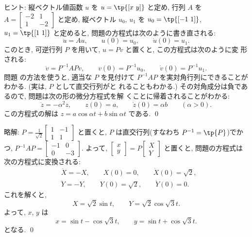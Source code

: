 \documentclass[12pt,twoside]{jarticle}
\newcommand\commentout[1]{#1}
\newcommand\commentout[1]{}
\begin{document}
\noindent
ヒント: 縦ベクトル値函数 $u$ を %
$u=\tp{[x\ y]}$ と定め, 行列 $A$ を %
$A=\begin{bmatrix}-2&1\\1&-2\end{bmatrix}$ と定め, 縦ベクトル $u_0$, $u_1$ 
を $u_0=\tp{[-1\ 1]}$, $u_1=\tp{[1\ 1]}$ と定めると, 
問題の方程式は次のように書き直される:
\begin{equation*}
  \ddot u = Au, \qquad u(0)=u_0, \qquad \dot u(0)=u_1.
\end{equation*}
このとき, 可逆行列 $P$ を用いて, $u=Pv$ と置くと, この方程式は次のように変
形される:
\begin{equation*}
  \ddot v = P^{-1}APv, \qquad v(0)=P^{-1}u_0, \qquad \dot v(0)=P^{-1}u_1.
\end{equation*}
問題  の方法を使うと, 適当な $P$ を見付けて %
$P^{-1}AP$ を実対角行列にできることがわかる. (実は, $P$ として直交行列がと
れることもわかる.) その対角成分は負であるので, 問題は次の形の微分方程式を解
くことに帰着されることがわかる:
\begin{equation*}
  \ddot z = - \alpha^2 z, \qquad z(0)=a, \qquad \dot z(0)= \alpha b
  \qquad (\alpha > 0).
\end{equation*}
この方程式の解は
\( %
  z = a \cos \alpha t + b \sin \alpha t
\) %
である.
\qed

\commentout{
\medskip
\noindent
略解: 
\( \displaystyle %
  P = \frac{1}{\sqrt{2}}
  \begin{bmatrix}
    1 & -1 \\
    1 & 1 
  \end{bmatrix}
\) %
と置くと, $P$ は直交行列(すなわち $P^{-1}=\tp{P}$)でかつ,
\( %
  P^{-1}AP =
  \begin{bmatrix}
    -1 &  0 \\
     0 & -3 
  \end{bmatrix}
\). %
よって,
\( %
  \begin{bmatrix} x \\ y \end{bmatrix} 
  = P \begin{bmatrix} X \\ Y \end{bmatrix} 
\) %
と置くと, 問題の方程式は次の方程式に変換される:
\begin{align*}
  & \ddot X = - X, \qquad X(0) = 0, \qquad \dot X(0) = \sqrt{2},
  \\
  & \ddot Y = - Y, \qquad Y(0) = \sqrt{2}, \qquad \dot Y(0) = 0.
\end{align*}
これを解くと,
\begin{equation*}
  X = \sqrt{2} \sin t, \qquad Y = \sqrt{2} \cos \sqrt{3} t.
\end{equation*}
よって, $x$, $y$ は
\begin{equation*}
  x = \sin t - \cos\sqrt{3}t, 
  \qquad
  y = \sin t + \cos\sqrt{3}t.
\end{equation*}
となる. 
\qed
}
\end{document}
